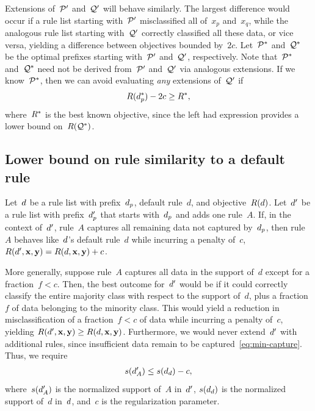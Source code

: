 Extensions of~$\cal P'$ and~$\cal Q'$ will behave similarly.
%
The largest difference would occur if a rule list starting with~$\cal P'$
misclassified all of~$x_p$ and~$x_q$, while the analogous rule list starting
with~$\cal Q'$ correctly classified all these data, or vice versa,
yielding a difference between objectives bounded by~$2c$.
%
Let~$\cal P^*$ and~$\cal Q^*$ be the optimal prefixes
starting with~$\cal P'$ and~$\cal Q'$, respectively.
%
Note that~$\cal P^*$ and~$\cal Q^*$ need not be derived from~$\cal P'$ and~$\cal Q'$
via analogous extensions.
%
If we know~$\cal P^*$, then we can avoid evaluating \emph{any} extensions of~$\cal Q'$ if
\begin{align}
\Obj(\Prefix^*) - 2 c \ge \Obj^*,
\end{align}
where~$R^*$ is the best known objective, since the left had expression
provides a lower bound on~$R(\cal{Q}^*)$.



\subsection{Lower bound on rule similarity to a default rule}

Let~${d}$ be a rule list with prefix~$d_p$, default rule~$d$, and objective~$R({d})$.
%
Let~${d}'$ be a rule list with prefix~$d_p'$ that starts with~$d_p$ and adds one rule~$A$.
%
If, in the context of~${d}'$, rule~$A$ captures all remaining data not captured by~$d_p$,
then rule~$A$ behaves like~${d}$'s default rule~$d$ while incurring a penalty of~$c$,
\ie ~${R({d}', \mathbf{x}, \mathbf{y}) = R({d}, \mathbf{x}, \mathbf{y}) + c}$.

More generally, suppose rule~$A$ captures all data in the support of~$d$
except for a fraction~${f < c}$.
%
Then, the best outcome for~${d}'$ would be if it could correctly classify
the entire majority class with respect to the support of~$d$,
plus a fraction~$f$ of data belonging to the minority class.
%
This would yield a reduction in misclassification of a fraction~${f < c}$
of data while incurring a penalty of~$c$, yielding
${R({d}', \mathbf{x}, \mathbf{y}) \ge R({d}, \mathbf{x}, \mathbf{y})}$.
%
Furthermore, we would never extend~${d}'$ with additional rules,
since insufficient data remain to be captured~\eqref{eq:min-capture}.
%
Thus, we require
\begin{align}
s(\RL'_A) \le s(\RL_d) - c,
\label{eq:max-capture}
\end{align}
where~$s({d}'_A)$ is the normalized support of~$A$ in~${d}'$,
$s({d}_d)$ is the normalized support of~$d$ in~${d}$,
and~$c$ is the regularization parameter.

